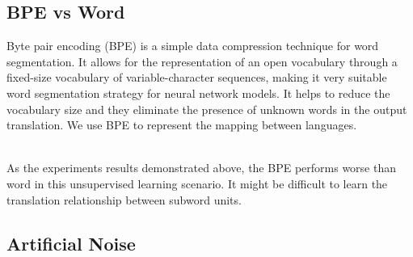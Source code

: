 \subsection{BPE vs Word}
Byte pair encoding (BPE) is a simple data compression technique for word segmentation. It allows for the representation of an open vocabulary through a fixed-size vocabulary of variable-character sequences, making it very suitable word segmentation strategy for neural network models. It helps to reduce the vocabulary size and they eliminate the presence of unknown words in the output translation. We use BPE to represent the mapping between languages. 
	\begin{table}[h]
	\centering
	\\

As the experiments results demonstrated above, the BPE performs worse than word in this unsupervised learning scenario. It might be difficult to learn the translation relationship between subword units. 
	
\end{table}
\subsection{Artificial Noise}

